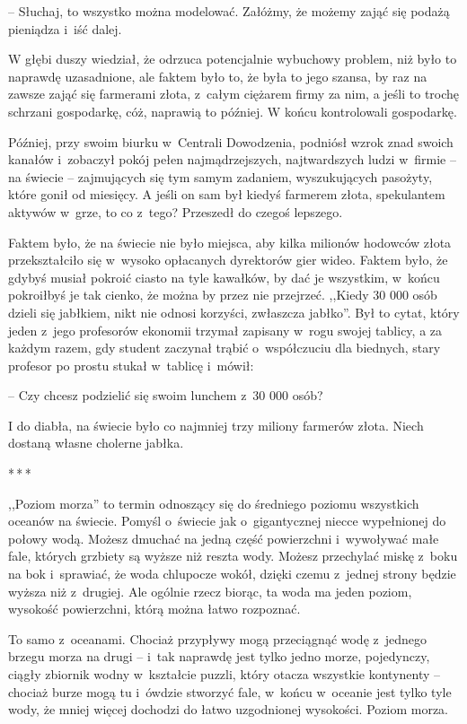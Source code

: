 \documentclass[oneside,polish,11pt,rmheadings]{mwbk}
\newcommand{\threeast}{\par\centerline{*\,*\,*}\medskip\par}
\begin{document}
-- Słuchaj, to wszystko można modelować. Załóżmy, że możemy zająć się podażą pieniądza i~iść dalej. 

W głębi duszy wiedział, że odrzuca potencjalnie wybuchowy problem, niż było to naprawdę uzasadnione, ale faktem było to, że była to jego szansa, by raz na zawsze zająć się farmerami złota, z~całym ciężarem firmy za nim, a jeśli to trochę schrzani gospodarkę, cóż, naprawią to później. W końcu kontrolowali gospodarkę.

Później, przy swoim biurku w~Centrali Dowodzenia, podniósł wzrok znad swoich kanałów i~zobaczył pokój pełen najmądrzejszych, najtwardszych ludzi w~firmie -- na świecie -- zajmujących się tym samym zadaniem, wyszukujących pasożyty, które gonił od miesięcy. A jeśli on sam był kiedyś farmerem złota, spekulantem aktywów w~grze, to co z~tego? Przeszedł do czegoś lepszego.

Faktem było, że na świecie nie było miejsca, aby kilka milionów hodowców złota przekształciło się w~wysoko opłacanych dyrektorów gier wideo. Faktem było, że gdybyś musiał pokroić ciasto na tyle kawałków, by dać je wszystkim, w~końcu pokroiłbyś je tak cienko, że można by przez nie przejrzeć. ,,Kiedy 30 000 osób dzieli się jabłkiem, nikt nie odnosi korzyści, zwłaszcza jabłko''. Był to cytat, który jeden z~jego profesorów ekonomii trzymał zapisany w~rogu swojej tablicy, a za każdym razem, gdy student zaczynał trąbić o~współczuciu dla biednych, stary profesor po prostu stukał w~tablicę i~mówił: 

-- Czy chcesz podzielić się swoim lunchem z~30 000 osób? 

I do diabła, na świecie było co najmniej trzy miliony farmerów złota. Niech dostaną własne cholerne jabłka.

\bigskip
\threeast

,,Poziom morza'' to termin odnoszący się do średniego poziomu wszystkich oceanów na świecie. Pomyśl o~świecie jak o~gigantycznej niecce wypełnionej do połowy wodą. Możesz dmuchać na jedną część powierzchni i~wywoływać małe fale, których grzbiety są wyższe niż reszta wody. Możesz przechylać miskę z~boku na bok i~sprawiać, że woda chlupocze wokół, dzięki czemu z~jednej strony będzie wyższa niż z~drugiej. Ale ogólnie rzecz biorąc, ta woda ma jeden poziom, wysokość powierzchni, którą można łatwo rozpoznać.

To samo z~oceanami. Chociaż przypływy mogą przeciągnąć wodę z~jednego brzegu morza na drugi -- i~tak naprawdę jest tylko jedno morze, pojedynczy, ciągły zbiornik wodny w~kształcie puzzli, który otacza wszystkie kontynenty -- chociaż burze mogą tu i~ówdzie stworzyć fale, w~końcu w~oceanie jest tylko tyle wody, że mniej więcej dochodzi do łatwo uzgodnionej wysokości. Poziom morza.
\end{document}
